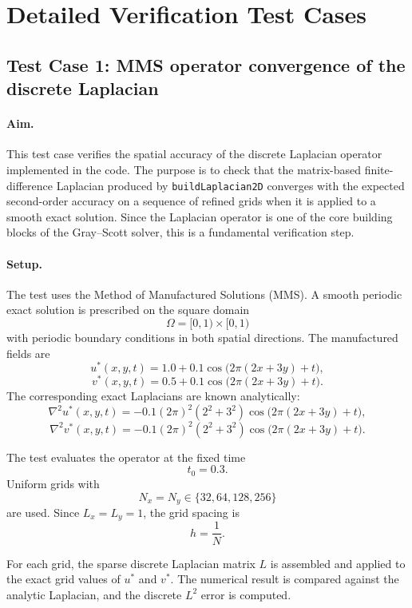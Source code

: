 \section{Detailed Verification Test Cases}
\label{sec:verification_detailed_cases}

\subsection{Test Case 1: MMS operator convergence of the discrete Laplacian}
\label{sec:verification_testcase_mms_operator}

\paragraph{Aim.}
This test case verifies the spatial accuracy of the discrete Laplacian operator implemented in the code. The purpose is to check that the matrix-based finite-difference Laplacian produced by \texttt{buildLaplacian2D} converges with the expected second-order accuracy on a sequence of refined grids when it is applied to a smooth exact solution. Since the Laplacian operator is one of the core building blocks of the Gray--Scott solver, this is a fundamental verification step.

\paragraph{Setup.}
The test uses the Method of Manufactured Solutions (MMS). A smooth periodic exact solution is prescribed on the square domain
\[
\Omega = [0,1)\times[0,1)
\]
with periodic boundary conditions in both spatial directions. The manufactured fields are
\[
u^\ast(x,y,t) = 1.0 + 0.1\cos\!\bigl(2\pi(2x+3y)+t\bigr),
\]
\[
v^\ast(x,y,t) = 0.5 + 0.1\cos\!\bigl(2\pi(2x+3y)+t\bigr).
\]
The corresponding exact Laplacians are known analytically:
\[
\nabla^2 u^\ast(x,y,t) = -0.1(2\pi)^2(2^2+3^2)\cos\!\bigl(2\pi(2x+3y)+t\bigr),
\]
\[
\nabla^2 v^\ast(x,y,t) = -0.1(2\pi)^2(2^2+3^2)\cos\!\bigl(2\pi(2x+3y)+t\bigr).
\]

The test evaluates the operator at the fixed time
\[
t_0 = 0.3.
\]
Uniform grids with
\[
N_x=N_y\in\{32,64,128,256\}
\]
are used. Since \(L_x=L_y=1\), the grid spacing is
\[
h = \frac{1}{N}.
\]

For each grid, the sparse discrete Laplacian matrix \(L\) is assembled and applied to the exact grid values of \(u^\ast\) and \(v^\ast\). The numerical result is compared against the analytic Laplacian, and the discrete \(L^2\) error is computed.

